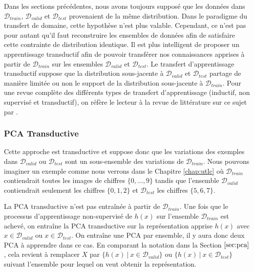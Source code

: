 Dans les sections précédentes, nous avons toujours supposé que les données dans
$\mathcal{D}_{train}$, $\mathcal{D}_{valid}$ et $\mathcal{D}_{test}$
provenaient de la même distribution. Dans le paradigme du transfert de domaine,
cette hypothèse n'est plus valable. Cependant, ce n'est pas pour autant qu'il
faut reconstruire les ensembles de données afin de satisfaire cette
contrainte de distribution identique. Il est plus intelligent de proposer un
apprentissage transductif afin de pouvoir transférer nos connaissances apprises
à partir de $\mathcal{D}_{train}$ sur les ensembles $\mathcal{D}_{valid}$ et
$\mathcal{D}_{test}$. Le transfert d'apprentissage transductif suppose que la
distribution sous-jacente à $\mathcal{D}_{valid}$ et $\mathcal{D}_{test}$
partage de manière limitée ou non le support de la distribution sous-jacente à
$\mathcal{D}_{train}$. Pour une revue complète des différents types de
transfert d'apprentissage (inductif, non supervisé et transductif), on réfère
le lecteur à la revue de littérature sur ce sujet par \citep{Pan-transfer}.

\subsubsection{PCA Transductive}

Cette approche est transductive et suppose donc que les variations des exemples
dans $\mathcal{D}_{valid}$ ou $\mathcal{D}_{test}$ sont un sous-ensemble des
variations de $\mathcal{D}_{train}$.  Nous pouvons imaginer un exemple comme
nous verrons dans le Chapitre \ref{chap:utlc} où $\mathcal{D}_{train}$
contiendrait toutes les images de chiffres $\lbrace 0,\dots,9 \rbrace$ tandis
que l'ensemble $\mathcal{D}_{valid}$ contiendrait seulement les chiffres
$\lbrace 0,1,2 \rbrace$ et $\mathcal{D}_{test}$ les chiffres $\lbrace 5,6,7
\rbrace$.

La PCA transductive n'est pas entraînée à partir de $\mathcal{D}_{train}$. Une
fois que le processus d'apprentissage non-supervisé de $h(x)$ sur l'ensemble
$\mathcal{D}_{train}$ est achevé, on entraîne la PCA transductive sur la
représentation apprise $h(x)$ avec $x\in\mathcal{D}_{valid}$ ou
$x\in\mathcal{D}_{test}$. On entraîne une PCA par ensemble, il y aura donc deux
PCA à apprendre dans ce cas. En comparant la notation dans la Section $\ref{sec:pca}$, cela
revient à remplacer $X$ par $\lbrace h(x)~|~x\in\mathcal{D}_{valid}\rbrace$ ou
$\lbrace h(x)~|~x\in\mathcal{D}_{test}\rbrace$ suivant l'ensemble pour lequel
on veut obtenir la représentation.

